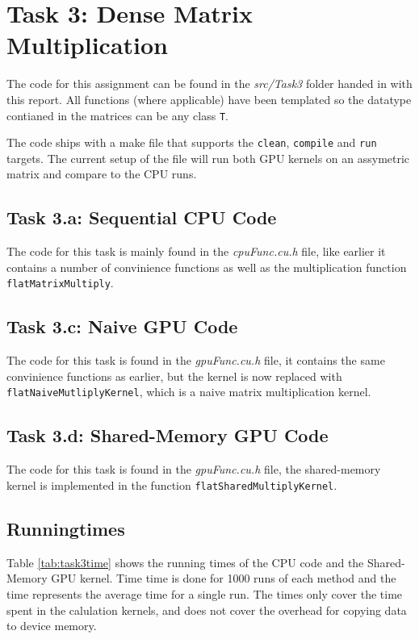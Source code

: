 \section{Task 3: Dense Matrix Multiplication}
The code for this assignment can be found in the \textit{src/Task3} folder
handed in with this report. All functions (where applicable) have been templated
so the datatype contianed in the matrices can be any class \texttt{T}.

The code ships with a make file that supports the \texttt{clean},
\texttt{compile} and \texttt{run} targets. The current setup of the file will
run both GPU kernels on an assymetric matrix and compare to the CPU runs.

\subsection{Task 3.a: Sequential CPU Code}
The code for this task is mainly found in the \textit{cpuFunc.cu.h} file, like
earlier it contains a number of convinience functions as well as the
multiplication function \texttt{flatMatrixMultiply}.

\subsection{Task 3.c: Naive GPU Code}
The code for this task is found in the \textit{gpuFunc.cu.h} file, it contains
the same convinience functions as earlier, but the kernel is now replaced with
\texttt{flatNaiveMutliplyKernel}, which is a naive matrix multiplication kernel.

\subsection{Task 3.d: Shared-Memory GPU Code}
The code for this task is found in the \textit{gpuFunc.cu.h} file, the
shared-memory kernel is implemented in the function
\texttt{flatSharedMultiplyKernel}.

\subsection{Runningtimes}

Table \ref{tab:task3time} shows the running times of the CPU code and the
Shared-Memory GPU kernel. Time time is done for 1000 runs of each method and the
time represents the average time for a single run. The times only cover the time
spent in the calulation kernels, and does not cover the overhead for copying
data to device memory.

